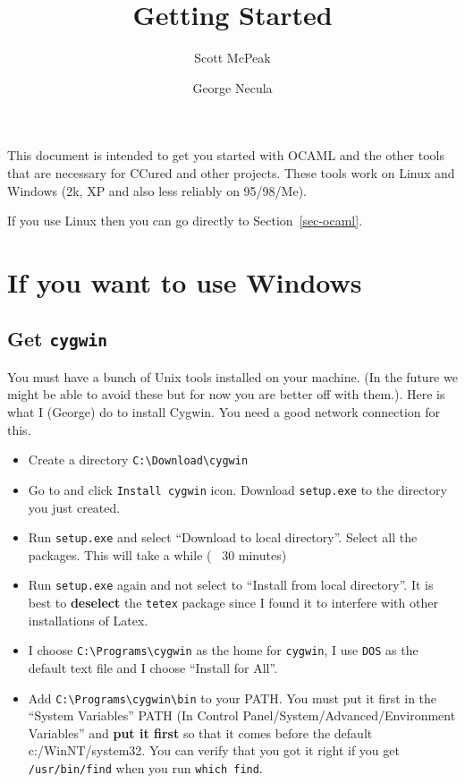 \documentclass{article}
\title{Getting Started}
\author{Scott McPeak \and George Necula}
\def\t#1{{\tt #1}}
\begin{document}
\maketitle

 This document is intended to get you started with OCAML and the other tools
that are necessary for CCured and other projects. These tools work on Linux
and Windows (2k, XP and also less reliably on 95/98/Me).

 If you use Linux then you can go directly to Section~\ref{sec-ocaml}.

\section{If you want to use Windows}

 \subsection{Get \t{cygwin}}

 You must have a bunch of Unix tools installed on your machine. (In the future
we might be able to avoid these but for now you are better off with them.).
Here is what I (George) do to install Cygwin. You need a good network
connection for this. 
\begin{itemize}
\item Create a directory \t{C:\backslash Download\backslash cygwin}
\item Go to  and click \t{Install
cygwin} icon. Download \t{setup.exe} to the directory you just created.
\item Run \t{setup.exe} and select ``Download to local directory''. Select all
the packages. This will take a while (~ 30 minutes)
\item Run \t{setup.exe} again and not select to ``Install from local
directory''. It is best to {\bf deselect} the \t{tetex} package since I found
it to interfere with other installations of Latex.
\item I choose \t{C:\backslash Programs\backslash cygwin} 
as the home for \t{cygwin}, I use \t{DOS} as the default text file and I
choose ``Install for All''. 
\item Add \t{C:\backslash Programs\backslash cygwin\backslash bin} to your
PATH. You must put it first in the ``System Variables'' PATH (In Control Panel/System/Advanced/Environment
Variables'' and {\bf put it first} so that it comes before the default
c:/WinNT/system32. You can verify that you got it right if you get
\t{/usr/bin/find} when you run \t{which find}. 
\end{itemize}
\end{document}
